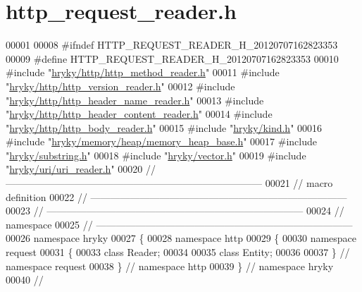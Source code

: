 \hypertarget{http__request__reader_8h_source}{\section{http\-\_\-request\-\_\-reader.\-h}
}

\begin{DoxyCode}
00001 
00008 \textcolor{preprocessor}{#ifndef HTTP\_REQUEST\_READER\_H\_20120707162823353}
00009 \textcolor{preprocessor}{}\textcolor{preprocessor}{#define HTTP\_REQUEST\_READER\_H\_20120707162823353}
00010 \textcolor{preprocessor}{}\textcolor{preprocessor}{#include "\hyperlink{http__method__reader_8h}{hryky/http/http_method_reader.h}"}
00011 \textcolor{preprocessor}{#include "\hyperlink{http__version__reader_8h}{hryky/http/http_version_reader.h}"}
00012 \textcolor{preprocessor}{#include "\hyperlink{http__header__name__reader_8h}{hryky/http/http_header_name_reader.h}"}
00013 \textcolor{preprocessor}{#include "\hyperlink{http__header__content__reader_8h}{hryky/http/http_header_content_reader.h}"}
00014 \textcolor{preprocessor}{#include "\hyperlink{http__body__reader_8h}{hryky/http/http_body_reader.h}"}
00015 \textcolor{preprocessor}{#include "\hyperlink{kind_8h}{hryky/kind.h}"}
00016 \textcolor{preprocessor}{#include "\hyperlink{memory__heap__base_8h}{hryky/memory/heap/memory_heap_base.h}"}
00017 \textcolor{preprocessor}{#include "\hyperlink{substring_8h}{hryky/substring.h}"}
00018 \textcolor{preprocessor}{#include "\hyperlink{vector_8h}{hryky/vector.h}"}
00019 \textcolor{preprocessor}{#include "\hyperlink{uri__reader_8h}{hryky/uri/uri_reader.h}"}
00020 \textcolor{comment}{//
      ------------------------------------------------------------------------------}
00021 \textcolor{comment}{// macro definition}
00022 \textcolor{comment}{//
      ------------------------------------------------------------------------------}
00023 \textcolor{comment}{//
      ------------------------------------------------------------------------------}
00024 \textcolor{comment}{// namespace}
00025 \textcolor{comment}{//
      ------------------------------------------------------------------------------}
00026 \textcolor{keyword}{namespace }hryky
00027 \{
00028 \textcolor{keyword}{namespace }http
00029 \{
00030 \textcolor{keyword}{namespace }request
00031 \{
00033     \textcolor{keyword}{class }Reader;
00034 
00035     \textcolor{keyword}{class }Entity;
00036 
00037 \} \textcolor{comment}{// namespace request}
00038 \} \textcolor{comment}{// namespace http}
00039 \} \textcolor{comment}{// namespace hryky}
00040 \textcolor{comment}{//
}
\end{DoxyCode}
